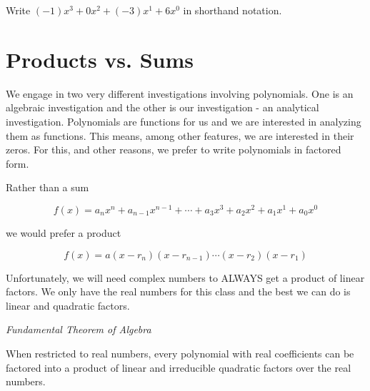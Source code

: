 \documentclass{ximera}
\begin{document}
\begin{question}

Write $(-1) x^3 + 0 x^2 + (-3) x^1 + 6 x^0$ in shorthand notation.


\begin{multipleChoice}
\end{multipleChoice}

\end{question}










\section{Products vs. Sums}


We engage in two very different investigations involving polynomials.  One is an algebraic investigation and the other is our investigation - an analytical investigation.  Polynomials are functions for us and we are interested in analyzing them as functions.  This means, among other features, we are interested in their zeros.  For this, and other reasons, we prefer to write polynomials in factored form.



Rather than a sum

\[   f(x) = a_n x^n + a_{n-1} x^{n-1} + \cdots + a_3 x^3 + a_2 x^2 + a_1 x^1 + a_0 x^0      \]

we would prefer a product

\[   f(x) = a (x-r_n)(x-r_{n-1})  \cdots (x-r_2)(x-r_1)  \]





Unfortunately, we will need complex numbers to ALWAYS get a product of linear factors.  We only have the real numbers for this class and the best we can do is linear and quadratic factors.



\begin{theorem} \textit{Fundamental Theorem of Algebra}

When restricted to real numbers, every polynomial with real coefficients can be factored into a product of linear and irreducible quadratic factors over the real numbers.

\end{theorem}
\end{document}
